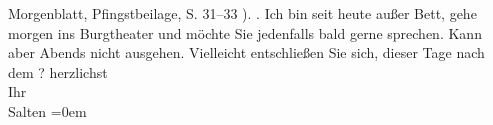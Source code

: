 \begin{ledgroupsized}[t]{13cm}
{{{                     Morgenblatt, Pfingstbeilage, S. 31–33 ). }}}\label{K_L03326-2h}.\pend
           \pstart
           Ich bin seit heute außer Bett, gehe morgen ins Burgtheater
               und möchte Sie jedenfalls bald gerne sprechen. Kann aber Abends nicht
               ausgehen. Vielleicht entschließen Sie sich, dieser Tage nach {\pb}dem \label{K_L03326-3v}\label{K_L03326-3h}?\pend
           \pstart
           herzlichst {\\[\baselineskip]}Ihr {\\[\baselineskip]}\spacefill\mbox{Salten}\pend
           \leftskip=0em{}
         
         \endnumbering{}\end{ledgroupsized}  \newcommand{\dateiname}{L03326}\newcommand{\titel}{Felix Salten an Arthur Schnitzler, 12. 3. 1902}\newcommand{\editorInnen}{Martin Anton Müller und Laura Untner}
      